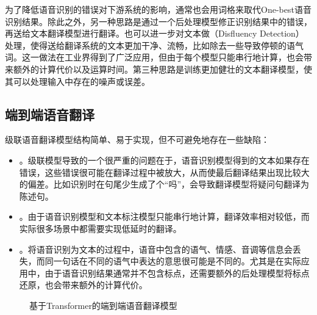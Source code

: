 \parinterval 为了降低语音识别的错误对下游系统的影响，通常也会用词格来取代One-best语音识别结果。除此之外，另一种思路是通过一个后处理模型修正识别结果中的错误，再送给文本翻译模型进行翻译。也可以进一步对文本做{\small{}}（Disfluency Detection）处理，使得送给翻译系统的文本更加干净、流畅，比如除去一些导致停顿的语气词。这一做法在工业界得到了广泛应用，但由于每个模型只能串行地计算，也会带来额外的计算代价以及运算时间。第三种思路是训练更加健壮的文本翻译模型，使其可以处理输入中存在的噪声或误差。


\subsection{端到端语音翻译}\label{end-to-end-speech-translation}

\parinterval 级联语音翻译模型结构简单、易于实现，但不可避免地存在一些缺陷：

\begin{itemize}
    \item {\small{}}。级联模型导致的一个很严重的问题在于，语音识别模型得到的文本如果存在错误，这些错误很可能在翻译过程中被放大，从而使最后翻译结果出现比较大的偏差。比如识别时在句尾少生成了个“吗”，会导致翻译模型将疑问句翻译为陈述句。
    \vspace{0.5em}
    \item {\small{}}。由于语音识别模型和文本标注模型只能串行地计算，翻译效率相对较低，而实际很多场景中都需要实现低延时的翻译。
    \vspace{0.5em}
    \item {\small{}}。将语音识别为文本的过程中，语音中包含的语气、情感、音调等信息会丢失，而同一句话在不同的语气中表达的意思很可能是不同的。尤其是在实际应用中，由于语音识别结果通常并不包含标点，还需要额外的后处理模型将标点还原，也会带来额外的计算代价。
\end{itemize}

\begin{figure}[htp]
\centering

\setlength{\abovecaptionskip}{-0.2em}
\caption{基于Transformer的端到端语音翻译模型}
\label{fig:17-7}
\end{figure}

